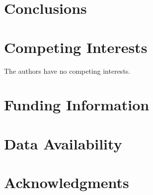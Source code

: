 \documentclass[12pt, oneside]{article}   	%
\begin{document}
\section{Conclusions}
	
\section*{Competing Interests} \vspace{3mm} The authors have no competing interests. 
	
\section*{Funding Information} 
	
\section*{Data Availability} 
	
\section*{Acknowledgments} 



\end{document}
